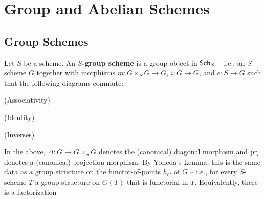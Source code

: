 \documentclass[11pt]{article}
\begin{document}
\section{Group and Abelian Schemes}\label{Group_Scheme_Section}
\subsection{Group Schemes}
Let $S$ be a scheme. An \textbf{$S$-group scheme} is a group object in $\operatorname{\mathsf{Sch}}_S$ -- i.e., an $S$-scheme $G$ together with morphisms $m: G\times_SG\to G$, $i: G\to G$, and $e: S\to G$ such that the following diagrams commute:
\begin{enum}{\roman}
\item[] (Associativity)

\begin{center}
\end{center}

\item[] (Identity)

\begin{center}
\end{center}

\item[] (Inverses)

\begin{center}
\end{center}
\end{enum}
In the above, $\Delta: G\to G\times_SG$ denotes the (canonical) diagonal morphism and $\operatorname{pr}_i$ denotes a (canonical) projection morphism. By Yoneda's Lemma, this is the same data as a group structure on the functor-of-points $h_G$ of $G$ -- i.e., for every $S$-scheme $T$ a group structure on $G(T)$ that is functorial in $T$. Equivalently, there is a factorization
\end{document}
